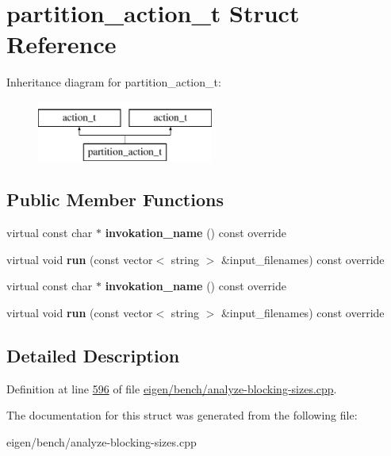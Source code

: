 \hypertarget{structpartition__action__t}{}\section{partition\+\_\+action\+\_\+t Struct Reference}
\label{structpartition__action__t}
Inheritance diagram for partition\+\_\+action\+\_\+t\+:\begin{figure}[H]
\begin{center}
\leavevmode
\includegraphics[height=2.000000cm]{structpartition__action__t}
\end{center}
\end{figure}
\subsection*{Public Member Functions}
\begin{DoxyCompactItemize}
\item 
\mbox{\label{structpartition__action__t_aa6231d0bf57211deab80b75c2e0424e1}} 
virtual const char $\ast$ {\bfseries invokation\+\_\+name} () const override
\item 
\mbox{\label{structpartition__action__t_a92678937e9eff8b5843e294ced4c29d8}} 
virtual void {\bfseries run} (const vector$<$ string $>$ \&input\+\_\+filenames) const override
\item 
\mbox{\label{structpartition__action__t_aa6231d0bf57211deab80b75c2e0424e1}} 
virtual const char $\ast$ {\bfseries invokation\+\_\+name} () const override
\item 
\mbox{\label{structpartition__action__t_a92678937e9eff8b5843e294ced4c29d8}} 
virtual void {\bfseries run} (const vector$<$ string $>$ \&input\+\_\+filenames) const override
\end{DoxyCompactItemize}


\subsection{Detailed Description}


Definition at line \hyperlink{eigen_2bench_2analyze-blocking-sizes_8cpp_source_l00596}{596} of file \hyperlink{eigen_2bench_2analyze-blocking-sizes_8cpp_source}{eigen/bench/analyze-\/blocking-\/sizes.\+cpp}.



The documentation for this struct was generated from the following file\+:\begin{DoxyCompactItemize}
\item 
eigen/bench/analyze-\/blocking-\/sizes.\+cpp\end{DoxyCompactItemize}
